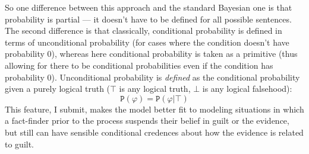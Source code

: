 \documentclass[10pt,leqno]{article}
\newcommand{\pr}[1]{\mbox{$\mathtt{P}(#1)$}}
\begin{document}
 So one difference between this approach and the standard Bayesian one is that  probability  is partial --- it doesn't have to be defined for all possible sentences.   The second difference is that  classically, conditional probability is defined in terms of unconditional probability (for cases where the condition doesn't have probability 0), whereas here  conditional probability is taken as a  primitive (thus allowing for there to be conditional probabilities even if the condition has probability 0). Unconditional probability is \emph{defined} as the conditional probability given a purely logical truth  ($\top$ is any logical truth,  $\bot$ is any logical falsehood):
 \[ \pr{\varphi}= \pr{\varphi \vert \top}\] 
 This feature, I submit, makes the model better fit to modeling situations in which a fact-finder prior to the process suspends their belief in guilt or the evidence, but still can have sensible conditional credences about how the evidence is related to guilt.  
 
 
 
\end{document}
